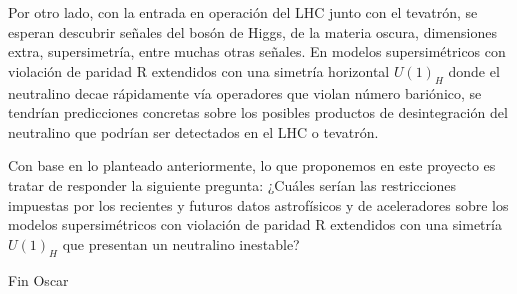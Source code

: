 \begin{ideas}
Por otro lado, con la entrada en operación del LHC junto con el tevatrón, 
se esperan descubrir señales del bosón de Higgs, de la materia oscura, dimensiones extra, 
supersimetría, entre muchas otras señales.  En modelos supersimétricos con violación de paridad R 
extendidos con una simetría horizontal $U(1)_H$ donde el neutralino decae rápidamente vía operadores 
que violan número bariónico, se tendrían predicciones concretas sobre los posibles productos de 
desintegración del neutralino que podrían ser detectados en el LHC o tevatrón.

Con base en lo planteado anteriormente, lo que proponemos en este proyecto es 
tratar de responder la siguiente pregunta: ¿Cuáles serían las restricciones 
impuestas por los recientes y futuros datos astrofísicos y de aceleradores sobre 
los modelos supersimétricos con violación de paridad R extendidos con una simetría $U(1)_H$ que presentan un neutralino inestable?

Fin Oscar

\end{ideas}
